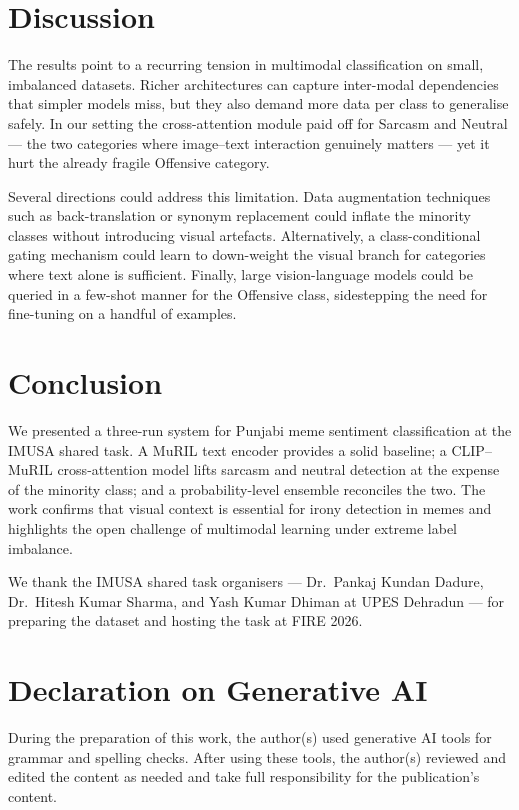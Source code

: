 \documentclass[
]{ceurart}
\begin{document}
\section{Discussion}

The results point to a recurring tension in multimodal classification on small, imbalanced datasets. Richer architectures can capture inter-modal dependencies that simpler models miss, but they also demand more data per class to generalise safely. In our setting the cross-attention module paid off for Sarcasm and Neutral --- the two categories where image--text interaction genuinely matters --- yet it hurt the already fragile Offensive category.

Several directions could address this limitation. Data augmentation techniques such as back-translation or synonym replacement could inflate the minority classes without introducing visual artefacts. Alternatively, a class-conditional gating mechanism could learn to down-weight the visual branch for categories where text alone is sufficient. Finally, large vision-language models could be queried in a few-shot manner for the Offensive class, sidestepping the need for fine-tuning on a handful of examples.

\section{Conclusion}

We presented a three-run system for Punjabi meme sentiment classification at the IMUSA shared task. A MuRIL text encoder provides a solid baseline; a CLIP--MuRIL cross-attention model lifts sarcasm and neutral detection at the expense of the minority class; and a probability-level ensemble reconciles the two. The work confirms that visual context is essential for irony detection in memes and highlights the open challenge of multimodal learning under extreme label imbalance.

\begin{acknowledgments}
We thank the IMUSA shared task organisers --- Dr.\ Pankaj Kundan Dadure, Dr.\ Hitesh Kumar Sharma, and Yash Kumar Dhiman at UPES Dehradun --- for preparing the dataset and hosting the task at FIRE 2026.
\end{acknowledgments}

\section*{Declaration on Generative AI}
During the preparation of this work, the author(s) used generative AI tools for grammar and spelling checks. After using these tools, the author(s) reviewed and edited the content as needed and take full responsibility for the publication's content.
\end{document}
